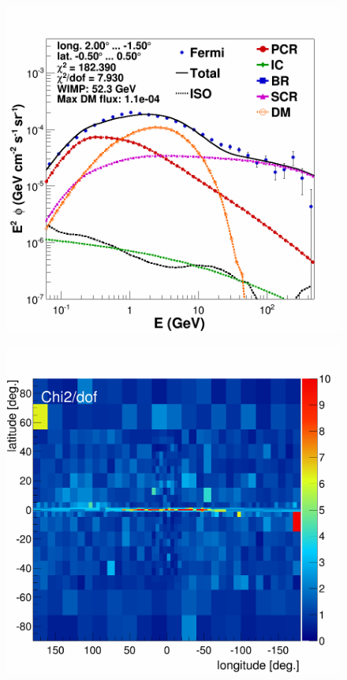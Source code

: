\begin{figure}[h]
\begin{minipage}[h]{0.45\textwidth}
  \label{fig:DMonly_chi2Distribution}
  \end{minipage}
  \hfill
  \begin{minipage}[h]{0.45\textwidth}
  	\centering
	\includegraphics[width=1\linewidth]{pic/results/DMonly_CMZ.png}
  	\label{fig:DMonly_CMZ}
  \end{minipage}
  \hfill
  \begin{minipage}[h]{0.45\textwidth}
  	\centering
	\includegraphics[width=1\linewidth]{pic/results/MSPonly_chi2Distribution.png}

\end{minipage}
\end{figure}
